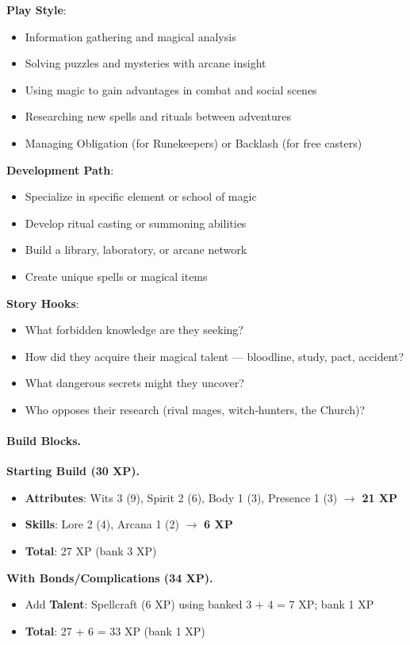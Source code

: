\textbf{Play Style}:
\begin{itemize}
\item Information gathering and magical analysis
\item Solving puzzles and mysteries with arcane insight
\item Using magic to gain advantages in combat and social scenes
\item Researching new spells and rituals between adventures
\item Managing Obligation (for Runekeepers) or Backlash (for free casters)
\end{itemize}

\textbf{Development Path}:
\begin{itemize}
\item Specialize in specific element or school of magic
\item Develop ritual casting or summoning abilities
\item Build a library, laboratory, or arcane network
\item Create unique spells or magical items
\end{itemize}

\textbf{Story Hooks}:
\begin{itemize}
\item What forbidden knowledge are they seeking?
\item How did they acquire their magical talent — bloodline, study, pact, accident?
\item What dangerous secrets might they uncover?
\item Who opposes their research (rival mages, witch‑hunters, the Church)?
\end{itemize}

\paragraph{Build Blocks.}
\textbf{Starting Build (30 XP).}
\begin{itemize}
\item \textbf{Attributes}: Wits 3 (9), Spirit 2 (6), Body 1 (3), Presence 1 (3) $\rightarrow$ \textbf{21 XP}
\item \textbf{Skills}: Lore 2 (4), Arcana 1 (2) $\rightarrow$ \textbf{6 XP}
\item \textbf{Total}: 27 XP (bank 3 XP)
\end{itemize}
\textbf{With Bonds/Complications (34 XP).}
\begin{itemize}
\item Add \textbf{Talent}: Spellcraft (6 XP) using banked 3 + 4 = 7 XP; bank 1 XP
\item \textbf{Total}: 27 + 6 = 33 XP (bank 1 XP)
\end{itemize}

